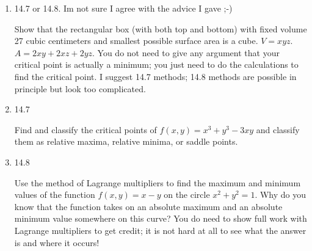 \documentclass[12pt]{article}
\begin{document}
\begin{enumerate}
\item 14.7 or 14.8.  Im not sure I agree with the advice I gave ;-)

Show that the rectangular box (with both top and bottom) with fixed volume 27 cubic centimeters and smallest possible surface area is a cube.
$V=xyz$.  $A = 2xy+2xz+2yz$.  You do not need to give any argument that your critical point is actually a minimum; you just need to do the calculations to find the critical point.   I suggest 14.7 methods;  14.8 methods are possible in principle but look too complicated.

\newpage

\newpage 

\item 14.7  

 Find and classify the critical points of $f(x,y)=x^3+y^3-3xy$ and classify them as relative maxima, relative minima, or saddle points.

\newpage

\item  14.8 

Use the method of Lagrange multipliers to find the maximum and minimum values of the function $f(x,y)=x-y$ on the circle $x^2+y^2=1$.   Why do you know that the function takes on an absolute maximum and an absolute minimum value somewhere on this curve?  You do need to show full work with Lagrange multipliers to get credit; it is not hard at all to see what the answer is and where it occurs!

\newpage











\end{enumerate}
\end{document}
